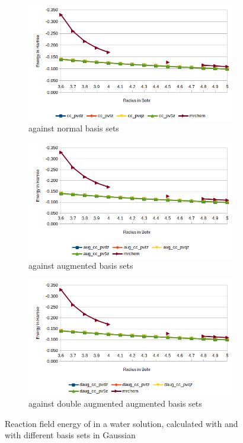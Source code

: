 \documentclass[../master_thesis.tex]{subfiles}
\begin{document}
\begin{figure}[h!]
  \centering
  \begin{subfigure}[b]{0.75\linewidth}
    \includegraphics[width=\linewidth]{img/Ernop.png}
    \caption{\mrchem against normal basis sets}
  \end{subfigure}
  \begin{subfigure}[b]{0.75\linewidth}
    \includegraphics[width=\linewidth]{img/Eraugnop.png}
    \caption{\mrchem against augmented basis sets}
  \end{subfigure}
  \begin{subfigure}[b]{0.75\linewidth}
    \includegraphics[width=\linewidth]{img/Erdaugnop.png}
    \caption{\mrchem against double augmented augmented basis sets}
  \end{subfigure}
  \caption[Energy plots for ]{Reaction field energy of  in a water solution, calculated with \mrchem
  and with different basis sets in Gaussian}
  \label{fig:nopEnergyplots}

\end{figure}
\end{document}
